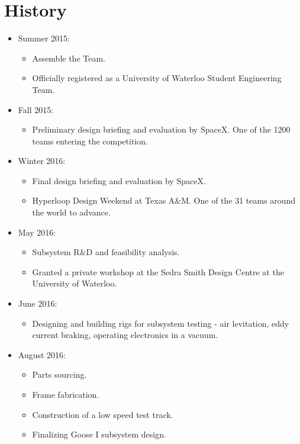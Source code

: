 \documentclass[main.tex]{subfiles}
\begin{document}
\section{History}
\begin{itemize}

\item Summer 2015:
\begin{itemize}
    \item Assemble the Team.
    \item Officially registered as a University of Waterloo Student Engineering Team.
\end{itemize}

\item Fall 2015:
\begin{itemize}
    \item Preliminary design briefing and evaluation by SpaceX. One of the 1200 teams entering the competition.
\end{itemize}

\item Winter 2016:
\begin{itemize}
    \item Final design briefing and evaluation by SpaceX.
    \item Hyperloop Design Weekend at Texas A\&M. One of the 31 teams around the world to advance.
\end{itemize}

\item May 2016:
\begin{itemize}
    \item Subsystem R\&D and feasibility analysis.
    \item Granted a private workshop at the Sedra Smith Design Centre at the University of Waterloo.
\end{itemize}

\item June 2016:
\begin{itemize}
    \item Designing and building rigs for subsystem testing - air levitation, eddy current braking, operating electronics in a vacuum.
\end{itemize}

\item August 2016:
\begin{itemize}
    \item Parts sourcing.
    \item Frame fabrication.
    \item Construction of a low speed test track.
    \item Finalizing Goose I subsystem design.
\end{itemize}


\end{itemize}
\end{document}
